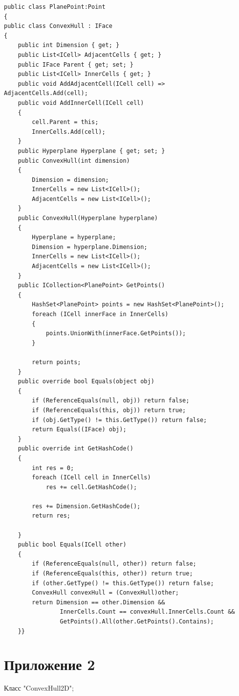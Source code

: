 \documentclass[14pt]{extarticle}
\begin{document}
\begin{lstlisting}[]
public class PlanePoint:Point
{
public class ConvexHull : IFace
{
    public int Dimension { get; }
    public List<ICell> AdjacentCells { get; }
    public IFace Parent { get; set; }
    public List<ICell> InnerCells { get; }
    public void AddAdjacentCell(ICell cell) => AdjacentCells.Add(cell);
    public void AddInnerCell(ICell cell)
    {
        cell.Parent = this;
        InnerCells.Add(cell);
    }
    public Hyperplane Hyperplane { get; set; }
    public ConvexHull(int dimension)
    {
        Dimension = dimension;
        InnerCells = new List<ICell>();
        AdjacentCells = new List<ICell>();
    }
    public ConvexHull(Hyperplane hyperplane)
    {
        Hyperplane = hyperplane;
        Dimension = hyperplane.Dimension;
        InnerCells = new List<ICell>();
        AdjacentCells = new List<ICell>();
    }
    public ICollection<PlanePoint> GetPoints()
    {
        HashSet<PlanePoint> points = new HashSet<PlanePoint>();
        foreach (ICell innerFace in InnerCells)
        {
            points.UnionWith(innerFace.GetPoints());
        }

        return points;
    }
    public override bool Equals(object obj)
    {
        if (ReferenceEquals(null, obj)) return false;
        if (ReferenceEquals(this, obj)) return true;
        if (obj.GetType() != this.GetType()) return false;
        return Equals((IFace) obj);
    }
    public override int GetHashCode()
    {
        int res = 0;
        foreach (ICell cell in InnerCells)
            res += cell.GetHashCode();

        res += Dimension.GetHashCode();
        return res;

    }
    public bool Equals(ICell other)
    {
        if (ReferenceEquals(null, other)) return false;
        if (ReferenceEquals(this, other)) return true;
        if (other.GetType() != this.GetType()) return false;
        ConvexHull convexHull = (ConvexHull)other;
        return Dimension == other.Dimension &&
                InnerCells.Count == convexHull.InnerCells.Count &&
                GetPoints().All(other.GetPoints().Contains);
    }}
\end{lstlisting}
\newpage
\section*{Приложение 2}
\label{add:PlanePoint}
Класс "ConvexHull2D";
\end{document}
